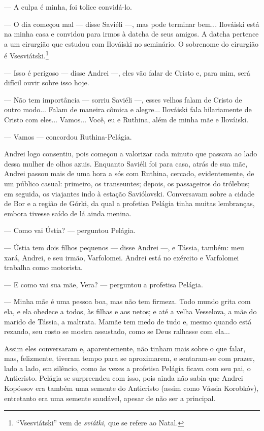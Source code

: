 --- A culpa é minha, foi tolice convidá-lo.

--- O dia começou mal --- disse Saviéli ---, mas pode terminar bem...
Ilováiski está na minha casa e convidou para irmos à datcha de seus
amigos. A datcha pertence a um cirurgião que estudou com Ilováiski no
seminário. O sobrenome do cirurgião é Vsesviátski.\footnote{``Vsesviátski''
  vem de \emph{sviátki,} que se refere ao Natal.}

--- Isso é perigoso --- disse Andrei ---, eles vão falar de Cristo e,
para mim, será difícil ouvir sobre isso hoje.

--- Não tem importância --- sorriu Saviéli ---, esses velhos falam de
Cristo de outro modo... Falam de maneira cômica e alegre... Ilováiski
fala hilariamente de Cristo com eles... Vamos... Você, eu e Ruthina,
além de minha mãe e Ilováiski.

--- Vamos --- concordou Ruthina-Pelágia.

Andrei logo consentiu, pois começou a valorizar cada minuto que passava
ao lado dessa mulher de olhos azuis. Enquanto Saviéli foi para casa,
atrás de sua mãe, Andrei passou mais de uma hora a sós com Ruthina,
cercado, evidentemente, de um público casual: primeiro, os transeuntes;
depois, os passageiros do trólebus; em seguida, os viajantes indo à
estação Saviólovski. Conversavam sobre a cidade de Bor e a região de
Górki, da qual a profetisa Pelágia tinha muitas lembranças, embora
tivesse saído de lá ainda menina.

--- Como vai Ústia? --- perguntou Pelágia.

--- Ústia tem dois filhos pequenos --- disse Andrei ---, e Tássia,
também: meu xará, Andrei, e seu irmão, Varfolomei. Andrei está no
exército e Varfolomei trabalha como motorista.

--- E como vai sua mãe, Vera? --- perguntou a profetisa Pelágia.

--- Minha mãe é uma pessoa boa, mas não tem firmeza. Todo mundo grita
com ela, e ela obedece a todos, às filhas e aos netos; e até a velha
Vesselova, a mãe do marido de Tássia, a maltrata. Mamãe tem medo de tudo
e, mesmo quando está rezando, seu rosto se mostra assustado, como se
Deus ralhasse com ela...

Assim eles conversaram e, aparentemente, não tinham mais sobre o que
falar, mas, felizmente, tiveram tempo para se aproximarem, e sentaram-se
com prazer, lado a lado, em silêncio, como às vezes a profetisa Pelágia
ficava com seu pai, o Anticristo. Pelágia se surpreendeu com isso, pois
ainda não sabia que Andrei Kopóssov era também uma semente do Anticristo
(assim como Vássia Korobkóv), entretanto era uma semente saudável,
apesar de não ser a principal.


